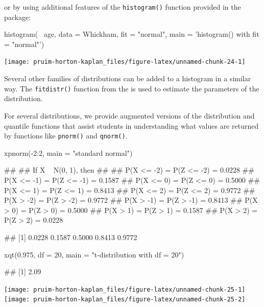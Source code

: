 \noindent
or by using additional features of the \texttt{histogram()} function
provided in the  package:

\begin{Schunk}
\begin{Sinput}
histogram( ~age, data = Whickham, fit = "normal", 
           main = 'histogram() with fit = "normal"')
\end{Sinput}


\begin{center}\texttt{[image: pruim-horton-kaplan\_files/figure-latex/unnamed-chunk-24-1]} \end{center}

\end{Schunk}

\noindent Several other families of distributions can be added to a
histogram in a similar way. The \texttt{fitdistr()} function from the
 \citep{MASS} is used to estimate the parameters of the
distribution.

For several distributions, we provide augmented versions of the
distribution and quantile functions that assist students in
understanding what values are returned by functions like
\texttt{pnorm()} and \texttt{qnorm()}.

\begin{Schunk}
\begin{Sinput}
xpnorm(-2:2, main = "standard normal")
\end{Sinput}
\begin{Soutput}
## 
## If X ~ N(0, 1), then 
## 
##  P(X <= -2) = P(Z <= -2) = 0.0228
##      P(X <= -1) = P(Z <= -1) = 0.1587
##      P(X <=  0) = P(Z <=  0) = 0.5000
##      P(X <=  1) = P(Z <=  1) = 0.8413
##      P(X <=  2) = P(Z <=  2) = 0.9772
##  P(X >  -2) = P(Z >  -2) = 0.9772
##      P(X >  -1) = P(Z >  -1) = 0.8413
##      P(X >   0) = P(Z >   0) = 0.5000
##      P(X >   1) = P(Z >   1) = 0.1587
##      P(X >   2) = P(Z >   2) = 0.0228
\end{Soutput}
\begin{Soutput}
## [1] 0.0228 0.1587 0.5000 0.8413 0.9772
\end{Soutput}
\begin{Sinput}
xqt(0.975, df = 20, main = "t-distribution with df = 20")
\end{Sinput}
\begin{Soutput}
## [1] 2.09
\end{Soutput}


\begin{center}\texttt{[image: pruim-horton-kaplan\_files/figure-latex/unnamed-chunk-25-1]} \texttt{[image: pruim-horton-kaplan\_files/figure-latex/unnamed-chunk-25-2]} \end{center}

\end{Schunk}

